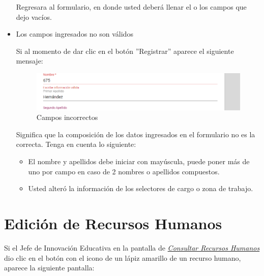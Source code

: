 \begin{itemize}
                         Regresara al formulario, en donde usted deberá llenar el o los campos que dejo vacíos.

                    \item Los campos ingresados no son válidos

                        Si al momento de dar clic en el botón ''Registrar'' aparece el siguiente mensaje:
                         \begin{figure}[H]
                            \centering
                            \includegraphics[width=0.4\linewidth]{images/SP1/MSG35}
                            \caption{Campos incorrectos}
                            \label{mensaje35}

                        \end{figure}

                        Significa que la composición de los datos ingresados en el formulario no es la correcta. Tenga en cuenta lo siguiente:

                        \begin{itemize}
                            \item El nombre y apellidos debe iniciar con mayúscula, puede poner más de uno por campo en caso de 2 nombres o apellidos compuestos.
                            \item Usted alteró la información de los selectores de cargo o zona de trabajo.
                        \end{itemize}

                \end{itemize}

\newpage

            \hypertarget{editar-RH}{}
            \section{Edición de Recursos Humanos}
                Si el Jefe de Innovación Educativa en la pantalla de \hyperlink{consultarRH}{\textit{Consultar Recursos Humanos}} dio clic en el botón con el icono de un lápiz amarillo de un recurso humano, aparece la siguiente pantalla:

